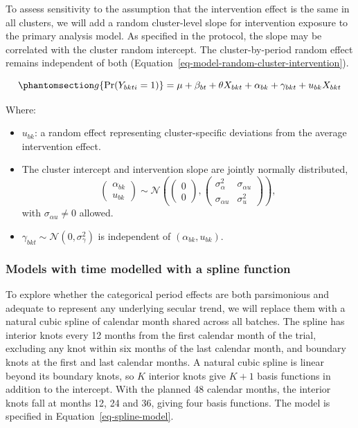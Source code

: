 \documentclass[
]{scrartcl}
\providecommand{\tightlist}{%
  \setlength{\itemsep}{0pt}\setlength{\parskip}{0pt}}\usepackage{longtable,booktabs,array}
\begin{document}
To assess sensitivity to the assumption that the intervention effect is
the same in all clusters, we will add a random cluster-level slope for
intervention exposure to the primary analysis model. As specified in the
protocol, the slope may be correlated with the cluster random intercept.
The cluster-by-period random effect remains independent of both
(Equation~\ref{eq-model-random-cluster-intervention}).

\begin{equation}\phantomsection\label{eq-model-random-cluster-intervention}{
g\{\Pr(Y_{bkti} = 1)\}
= \mu + \beta_{bt} + \theta X_{bkt} + \alpha_{bk} + \gamma_{bkt} + u_{bk} X_{bkt}
}\end{equation}

Where:

\begin{itemize}
\tightlist
\item
  \(u_{bk}\): a random effect representing cluster-specific deviations
  from the average intervention effect.
\item
  The cluster intercept and intervention slope are jointly normally
  distributed, \[
  \begin{pmatrix}
  \alpha_{bk} \\
  u_{bk}
  \end{pmatrix}
  \sim
  \mathcal{N}\!\left(
  \begin{pmatrix}
  0 \\
  0
  \end{pmatrix},
  \begin{pmatrix}
  \sigma^2_{\alpha} & \sigma_{\alpha u} \\
  \sigma_{\alpha u} & \sigma^2_{u}
  \end{pmatrix}
  \right),
  \] with \(\sigma_{\alpha u} \neq 0\) allowed.
\item
  \(\gamma_{bkt} \sim \mathcal{N}(0,\sigma^2_{\gamma})\) is independent
  of \((\alpha_{bk}, u_{bk})\).
\end{itemize}

\subsubsection{Models with time modelled with a spline
function}\label{sec-models-with-time-modelled-with-a-spline-function}

To explore whether the categorical period effects are both parsimonious
and adequate to represent any underlying secular trend, we will replace
them with a natural cubic spline of calendar month shared across all
batches. The spline has interior knots every 12 months from the first
calendar month of the trial, excluding any knot within six months of the
last calendar month, and boundary knots at the first and last calendar
months. A natural cubic spline is linear beyond its boundary knots, so
\(K\) interior knots give \(K + 1\) basis functions in addition to the
intercept. With the planned 48 calendar months, the interior knots fall
at months 12, 24 and 36, giving four basis functions. The model is
specified in Equation~\ref{eq-spline-model}.
\end{document}
